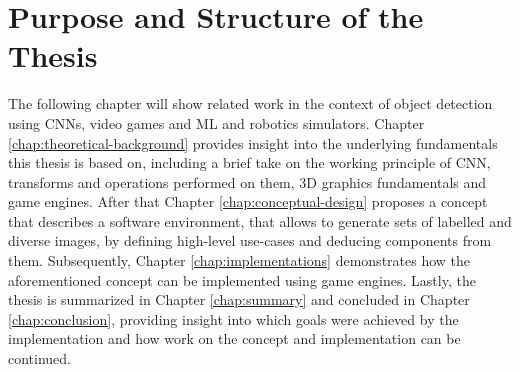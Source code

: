 \section{Purpose and Structure of the Thesis}
The following chapter will show related work in the context of object detection using \acp{CNN}, video games and \ac{ML} and robotics simulators. Chapter \ref{chap:theoretical-background} provides insight into the underlying fundamentals this thesis is based on, including a brief take on the working principle of \ac{CNN}, transforms and operations performed on them, 3D graphics fundamentals and game engines. After that Chapter \ref{chap:conceptual-design} proposes a concept that describes a software environment, that allows to generate sets of labelled and diverse images, by defining high-level use-cases and deducing components from them. Subsequently, Chapter \ref{chap:implementations} demonstrates how the aforementioned concept can be implemented using game engines. Lastly, the thesis is summarized in Chapter \ref{chap:summary} and concluded in Chapter \ref{chap:conclusion}, providing insight into which goals were achieved by the implementation and how work on the concept and implementation can be continued.
